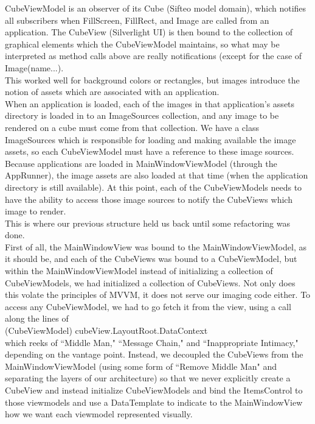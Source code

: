 \documentclass[12pt]{article}
\begin{document}
CubeViewModel is an observer of its Cube (Sifteo model domain), which notifies all subscribers when FillScreen, FillRect, and Image are called from an application. The CubeView (Silverlight UI) is then bound to the collection of graphical elements which the CubeViewModel maintains, so what may be interpreted as method calls above are really notifications (except for the case of Image(name...). \\

This worked well for background colors or rectangles, but images introduce the notion of assets which are associated with an application. \\

When an application is loaded, each of the images in that application's assets directory is loaded in to an ImageSources collection, and any image to be rendered on a cube must come from that collection. We have a class ImageSources which is responsible for loading and making available the image assets, so each CubeViewModel must have a reference to these image sources. Because applications are loaded in MainWindowViewModel (through the AppRunner), the image assets are also loaded at that time (when the application directory is still available). At this point, each of the CubeViewModels needs to have the ability to access those image sources to notify the CubeViews which image to render. \\

This is where our previous structure held us back until some refactoring was done. \\

First of all, the MainWindowView was bound to the MainWindowViewModel, as it should be, and each of the CubeViews was bound to a CubeViewModel, but within the MainWindowViewModel instead of initializing a collection of CubeViewModels, we had initialized a collection of CubeViews. Not only does this volate the principles of MVVM, it does not serve our imaging code either. To access any CubeViewModel, we had to go fetch it from the view, using a call along the lines of \\

(CubeViewModel) cubeView.LayoutRoot.DataContext \\

which reeks of ``Middle Man," ``Message Chain," and ``Inappropriate Intimacy," depending on the vantage point. Instead, we decoupled the CubeViews from the MainWindowViewModel (using some form of ``Remove Middle Man" and separating the layers of our architecture)  so that we never explicitly create a CubeView and instead initialize CubeViewModels and bind the ItemsControl to those viewmodels and use a DataTemplate to indicate to the MainWindowView how we want each viewmodel represented visually. \\
\end{document}
